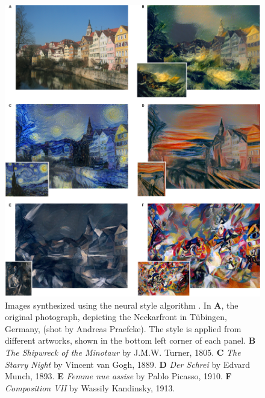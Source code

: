\begin{figure}[!htb]
  \includegraphics[width=\textwidth]{gfx/neural-style-examples}
  \caption{
    Images synthesized using the neural style algorithm \cite{Gatys2015B}.
    In \textbf{A}, the original photograph, depicting the Neckarfront in T\"ubingen, Germany, (shot by Andreas Praefcke).
    The style is applied from different artworks, shown in the bottom left corner of each panel.
    \textbf{B} \emph{The Shipwreck of the Minotaur} by J.M.W. Turner, 1805.
    \textbf{C} \emph{The Starry Night} by Vincent van Gogh, 1889.
    \textbf{D} \emph{Der Schrei} by Edvard Munch, 1893.
    \textbf{E} \emph{Femme nue assise} by Pablo Picasso, 1910.
    \textbf{F} \emph{Composition VII} by Wassily Kandinsky, 1913.
  }
  \label{sub:system:examples}
\end{figure}

